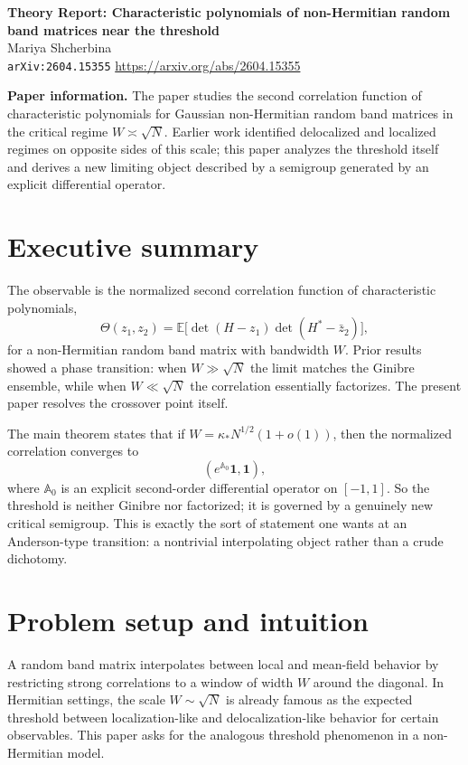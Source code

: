\documentclass[11pt]{article}
\begin{document}
\begin{center}
{\Large \textbf{Theory Report: Characteristic polynomials of non-Hermitian random band matrices near the threshold}}\\[0.5em]
{\large Mariya Shcherbina}\\[0.25em]
\texttt{arXiv:2604.15355} \quad \url{https://arxiv.org/abs/2604.15355}
\end{center}

\textbf{Paper information.} The paper studies the second correlation function of characteristic polynomials for Gaussian non-Hermitian random band matrices in the critical regime $W\asymp \sqrt N$. Earlier work identified delocalized and localized regimes on opposite sides of this scale; this paper analyzes the threshold itself and derives a new limiting object described by a semigroup generated by an explicit differential operator.

\section*{Executive summary}
The observable is the normalized second correlation function of characteristic polynomials,
\[
\Theta(z_1,z_2)=\mathbb E\big[\det(H-z_1)\det(H^*-\bar z_2)\big],
\]
for a non-Hermitian random band matrix with bandwidth $W$. Prior results showed a phase transition: when $W\gg\sqrt N$ the limit matches the Ginibre ensemble, while when $W\ll\sqrt N$ the correlation essentially factorizes. The present paper resolves the crossover point itself.

The main theorem states that if $W=\kappa_*N^{1/2}(1+o(1))$, then the normalized correlation converges to
\[
(e^{\mathbb A_0}\mathbf 1,\mathbf 1),
\]
where $\mathbb A_0$ is an explicit second-order differential operator on $[-1,1]$. So the threshold is neither Ginibre nor factorized; it is governed by a genuinely new critical semigroup. This is exactly the sort of statement one wants at an Anderson-type transition: a nontrivial interpolating object rather than a crude dichotomy.

\section*{Problem setup and intuition}
A random band matrix interpolates between local and mean-field behavior by restricting strong correlations to a window of width $W$ around the diagonal. In Hermitian settings, the scale $W\sim \sqrt N$ is already famous as the expected threshold between localization-like and delocalization-like behavior for certain observables. This paper asks for the analogous threshold phenomenon in a non-Hermitian model.
\end{document}

